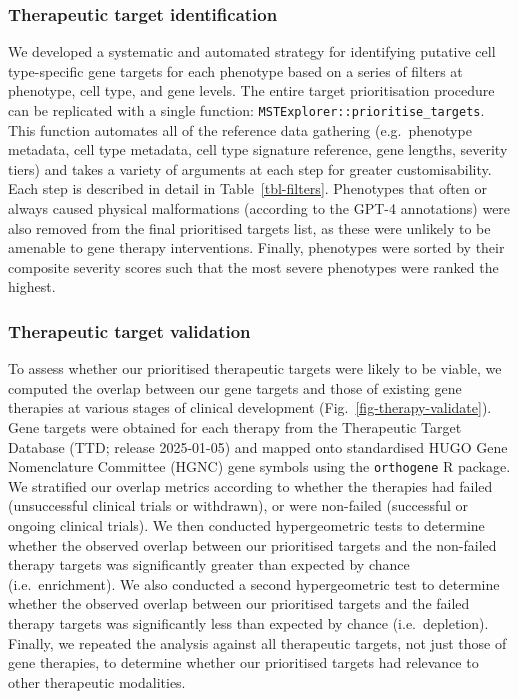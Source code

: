 \documentclass[
]{article}
\begin{document}
\subsubsection{Therapeutic target
identification}\label{therapeutic-target-identification-1}

We developed a systematic and automated strategy for identifying
putative cell type-specific gene targets for each phenotype based on a
series of filters at phenotype, cell type, and gene levels. The entire
target prioritisation procedure can be replicated with a single
function: \texttt{MSTExplorer::prioritise\_targets}. This function
automates all of the reference data gathering (e.g.~phenotype metadata,
cell type metadata, cell type signature reference, gene lengths,
severity tiers) and takes a variety of arguments at each step for
greater customisability. Each step is described in detail in
Table~\ref{tbl-filters}. Phenotypes that often or always caused physical
malformations (according to the GPT-4 annotations) were also removed
from the final prioritised targets list, as these were unlikely to be
amenable to gene therapy interventions. Finally, phenotypes were sorted
by their composite severity scores such that the most severe phenotypes
were ranked the highest.

\subsubsection{Therapeutic target
validation}\label{therapeutic-target-validation-1}

To assess whether our prioritised therapeutic targets were likely to be
viable, we computed the overlap between our gene targets and those of
existing gene therapies at various stages of clinical development
(Fig.~\ref{fig-therapy-validate}). Gene targets were obtained for each
therapy from the Therapeutic Target Database (TTD; release 2025-01-05)
and mapped onto standardised HUGO Gene Nomenclature Committee (HGNC)
gene symbols using the \texttt{orthogene} R package. We stratified our
overlap metrics according to whether the therapies had failed
(unsuccessful clinical trials or withdrawn), or were non-failed
(successful or ongoing clinical trials). We then conducted
hypergeometric tests to determine whether the observed overlap between
our prioritised targets and the non-failed therapy targets was
significantly greater than expected by chance (i.e.~enrichment). We also
conducted a second hypergeometric test to determine whether the observed
overlap between our prioritised targets and the failed therapy targets
was significantly less than expected by chance (i.e.~depletion).
Finally, we repeated the analysis against all therapeutic targets, not
just those of gene therapies, to determine whether our prioritised
targets had relevance to other therapeutic modalities.
\end{document}
